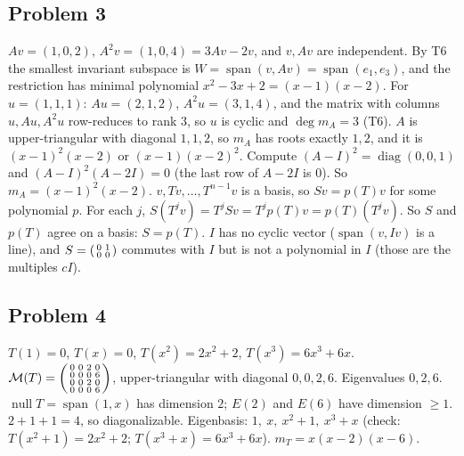 \documentclass[10pt]{scrartcl}
\DeclareMathOperator{\nul}{null}
\DeclareMathOperator{\spn}{span}
\newcommand{\MM}{\mathcal M}
\begin{document}
\subsection*{Problem 3}
\begin{enumerate}[(a)]
  \ii $Av=(1,0,2)$, $A^2v=(1,0,4)=3Av-2v$, and $v,Av$ are independent. By T6 the smallest invariant subspace is $W=\spn(v,Av)=\spn(e_1,e_3)$, and the restriction has minimal polynomial $x^2-3x+2=(x-1)(x-2)$.
  For $u=(1,1,1)$: $Au=(2,1,2)$, $A^2u=(3,1,4)$, and the matrix with columns $u,Au,A^2u$ row-reduces to rank $3$, so $u$ is cyclic and $\deg m_A=3$ (T6). $A$ is upper-triangular with diagonal $1,1,2$, so $m_A$ has roots exactly $1,2$, and it is $(x-1)^2(x-2)$ or $(x-1)(x-2)^2$. Compute $(A-I)^2=\operatorname{diag}(0,0,1)$ and $(A-I)^2(A-2I)=0$ (the last row of $A-2I$ is $0$). So $m_A=(x-1)^2(x-2)$.
  \ii $v,Tv,\dots,T^{n-1}v$ is a basis, so $Sv=p(T)v$ for some polynomial $p$. For each $j$, $S(T^jv)=T^jSv=T^jp(T)v=p(T)(T^jv)$. So $S$ and $p(T)$ agree on a basis: $S=p(T)$.
  \ii $I$ has no cyclic vector ($\spn(v,Iv)$ is a line), and $S=\begin{psmallmatrix}0&1\\0&0\end{psmallmatrix}$ commutes with $I$ but is not a polynomial in $I$ (those are the multiples $cI$).
\end{enumerate}

\subsection*{Problem 4}
\begin{enumerate}[(a)]
  \ii $T(1)=0$, $T(x)=0$, $T(x^2)=2x^2+2$, $T(x^3)=6x^3+6x$. $\MM(T)=\begin{psmallmatrix}0&0&2&0\\0&0&0&6\\0&0&2&0\\0&0&0&6\end{psmallmatrix}$, upper-triangular with diagonal $0,0,2,6$. Eigenvalues $0,2,6$.
  \ii $\nul T=\spn(1,x)$ has dimension $2$; $E(2)$ and $E(6)$ have dimension $\ge1$. $2+1+1=4$, so diagonalizable. Eigenbasis: $1,\ x,\ x^2+1,\ x^3+x$ (check: $T(x^2+1)=2x^2+2$; $T(x^3+x)=6x^3+6x$).
  \ii $m_T=x(x-2)(x-6)$.
\end{enumerate}
\end{document}
